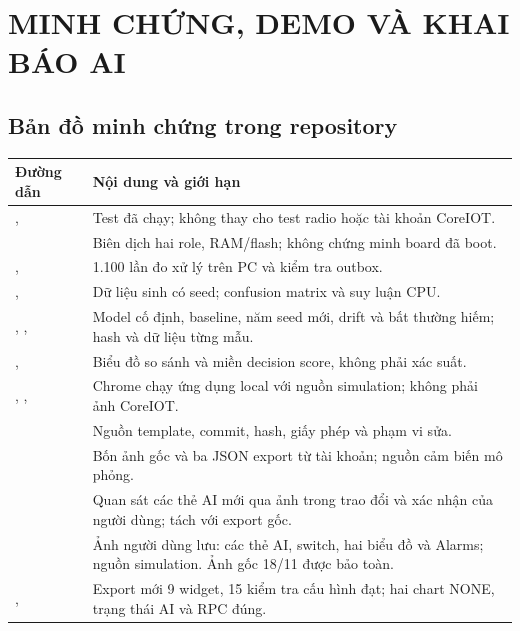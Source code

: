 \appendix
\chapter{MINH CHỨNG, DEMO VÀ KHAI BÁO AI}
\section{Bản đồ minh chứng trong repository}
\begin{longtable}{P{6.1cm}P{8.7cm}}
\toprule Đường dẫn & Nội dung và giới hạn \\ \midrule
{},  & Test đã chạy; không thay cho test radio hoặc tài khoản CoreIOT. \\
 & Biên dịch hai role, RAM/flash; không chứng minh board đã boot. \\
,  & 1.100 lần đo xử lý trên PC và kiểm tra outbox. \\
,  & Dữ liệu sinh có seed; confusion matrix và suy luận CPU. \\
, ,  & Model cố định, baseline, năm seed mới, drift và bất thường hiếm; hash và dữ liệu từng mẫu. \\
,  & Biểu đồ so sánh và miền decision score, không phải xác suất. \\
, ,  & Chrome chạy ứng dụng local với nguồn simulation; không phải ảnh CoreIOT. \\
 & Nguồn template, commit, hash, giấy phép và phạm vi sửa. \\
 & Bốn ảnh gốc và ba JSON export từ tài khoản; nguồn cảm biến mô phỏng. \\
 & Quan sát các thẻ AI mới qua ảnh trong trao đổi và xác nhận của người dùng; tách với export gốc. \\
 & Ảnh người dùng lưu: các thẻ AI, switch, hai biểu đồ và Alarms; nguồn simulation. Ảnh gốc 18/11 được bảo toàn. \\
,  & Export mới 9 widget, 15 kiểm tra cấu hình đạt; hai chart NONE, trạng thái AI và RPC đúng. \\

\end{longtable}
